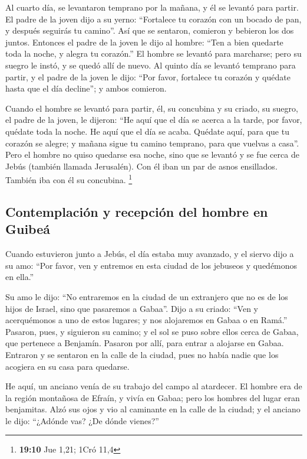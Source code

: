\begin{paracol}{2}
 Al cuarto día, se levantaron temprano por la mañana, y él
se levantó para partir. El padre de la joven dijo a su yerno:
``Fortalece tu corazón con un bocado de pan, y después seguirás tu
camino''.  Así que se sentaron, comieron y bebieron los
dos juntos. Entonces el padre de la joven le dijo al hombre: ``Ten a
bien quedarte toda la noche, y alegra tu corazón.''  El
hombre se levantó para marcharse; pero su suegro le instó, y se quedó
allí de nuevo.  Al quinto día se levantó temprano para
partir, y el padre de la joven le dijo: ``Por favor, fortalece tu
corazón y quédate hasta que el día decline''; y ambos comieron.

 Cuando el hombre se levantó para partir, él, su concubina
y su criado, su suegro, el padre de la joven, le dijeron: ``He aquí que
el día se acerca a la tarde, por favor, quédate toda la noche. He aquí
que el día se acaba. Quédate aquí, para que tu corazón se alegre; y
mañana sigue tu camino temprano, para que vuelvas a casa''.
 Pero el hombre no quiso quedarse esa noche, sino que se
levantó y se fue cerca de Jebús (también llamada Jerusalén). Con él iban
un par de asnos ensillados. También iba con él su concubina. \footnote{\textbf{19:10}
  Jue 1,21; 1Cró 11,4}

\hypertarget{contemplaciuxf3n-y-recepciuxf3n-del-hombre-en-guibeuxe1}{%
\subsection{Contemplación y recepción del hombre en
Guibeá}\label{contemplaciuxf3n-y-recepciuxf3n-del-hombre-en-guibeuxe1}}

 Cuando estuvieron junto a Jebús, el día estaba muy
avanzado, y el siervo dijo a su amo: ``Por favor, ven y entremos en esta
ciudad de los jebuseos y quedémonos en ella.''

 Su amo le dijo: ``No entraremos en la ciudad de un
extranjero que no es de los hijos de Israel, sino que pasaremos a
Gabaa''.  Dijo a su criado: ``Ven y acerquémonos a uno de
estos lugares; y nos alojaremos en Gabaa o en Ramá.'' 
Pasaron, pues, y siguieron su camino; y el sol se puso sobre ellos cerca
de Gabaa, que pertenece a Benjamín.  Pasaron por allí,
para entrar a alojarse en Gabaa. Entraron y se sentaron en la calle de
la ciudad, pues no había nadie que los acogiera en su casa para
quedarse.

 He aquí, un anciano venía de su trabajo del campo al
atardecer. El hombre era de la región montañosa de Efraín, y vivía en
Gabaa; pero los hombres del lugar eran benjamitas.  Alzó
sus ojos y vio al caminante en la calle de la ciudad; y el anciano le
dijo: ``¿Adónde vas? ¿De dónde vienes?''


\end{paracol}
